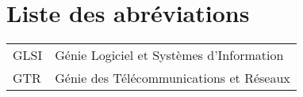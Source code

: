 \chapter*{Liste des abréviations}
      \begin{tabular}{ll}
         GLSI & Génie Logiciel et Systèmes d’Information \\
         GTR & Génie des Télécommunications et Réseaux \\
      \end{tabular}
\clearpage
